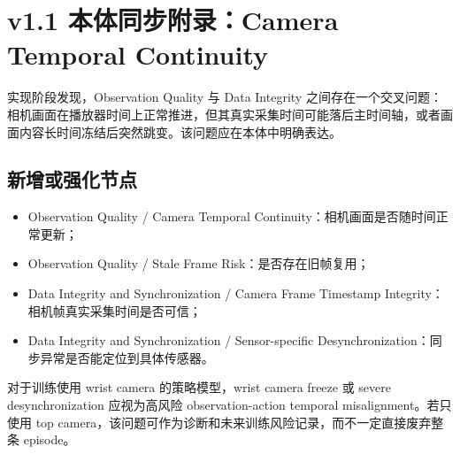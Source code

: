 \documentclass[UTF8,zihao=-4]{ctexart}
\begin{document}
\newpage
\section*{v1.1 本体同步附录：Camera Temporal Continuity}

实现阶段发现，Observation Quality 与 Data Integrity 之间存在一个交叉问题：相机画面在播放器时间上正常推进，但其真实采集时间可能落后主时间轴，或者画面内容长时间冻结后突然跳变。该问题应在本体中明确表达。

\subsection*{新增或强化节点}

\begin{itemize}
\item Observation Quality / Camera Temporal Continuity：相机画面是否随时间正常更新；
\item Observation Quality / Stale Frame Risk：是否存在旧帧复用；
\item Data Integrity and Synchronization / Camera Frame Timestamp Integrity：相机帧真实采集时间是否可信；
\item Data Integrity and Synchronization / Sensor-specific Desynchronization：同步异常是否能定位到具体传感器。
\end{itemize}

对于训练使用 wrist camera 的策略模型，wrist camera freeze 或 severe desynchronization 应视为高风险 observation-action temporal misalignment。若只使用 top camera，该问题可作为诊断和未来训练风险记录，而不一定直接废弃整条 episode。
\end{document}
